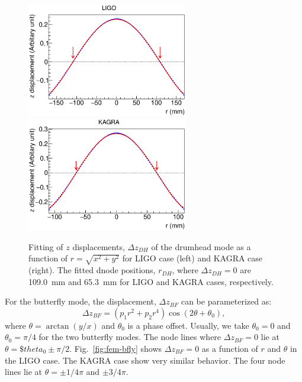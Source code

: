 \begin{figure}
\begin{center}
\includegraphics[width=7cm]{Figures/fem-nfit1.eps}
\includegraphics[width=7cm]{Figures/fem-nfit2.eps}
\caption{Fitting of $z$ displacements, $\Delta z_{DH}$ of the drumhead mode 
as a function of $r=\sqrt{x^2+y^2}$ for 
LIGO case (left) and KAGRA case (right). 
The fitted dnode positions, $r_{DH}$, where $\Delta z_{DH}=0$ 
are 109.0~mm and 65.3~mm for LIGO and KAGRA cases, respectively.} 
\label{fig:fem-dnode}
\end{center}
\end{figure}

For the butterfly mode, the displacement, $\Delta z_{BF}$ 
can be parameterized as:
\begin{equation}
\label{eq:fem-butt}
\Delta z_{BF} = (p_1 r^2+p_2 r^4)\cos(2\theta+\theta_0),
\end{equation}
where $\theta=\arctan(y/x)$ and $\theta_0$ is a phase offset.
Usually, we take $\theta_0=0$ and $\theta_0=\pi/4$ for 
the two butterfly modes. The node lines where $\Delta z_{BF}=0$ lie 
at $\theta=\$theta_0\pm\pi/2$. Fig.~\ref{fig:fem-bfly} shows 
$\Delta z_{BF}=0$ as a function of $r$ and $\theta$ in the LIGO case.
The KAGRA case show very similar behavior.
The four node lines lie at $\theta=\pm1/4\pi$ and $\pm3/4\pi$.

